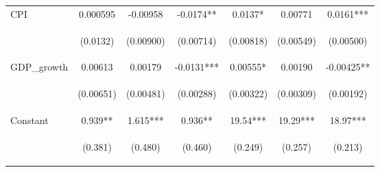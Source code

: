 \documentclass[]{article}
\begin{document}
\begin{center}
\begin{tabular}{lcccccc}
CPI & 0.000595 & -0.00958 & -0.0174** & 0.0137* & 0.00771 & 0.0161*** \\
\vspace{4pt} & \begin{footnotesize}(0.0132)\end{footnotesize} & \begin{footnotesize}(0.00900)\end{footnotesize} & \begin{footnotesize}(0.00714)\end{footnotesize} & \begin{footnotesize}(0.00818)\end{footnotesize} & \begin{footnotesize}(0.00549)\end{footnotesize} & \begin{footnotesize}(0.00500)\end{footnotesize} \\
GDP\_growth & 0.00613 & 0.00179 & -0.0131*** & 0.00555* & 0.00190 & -0.00425** \\
\vspace{4pt} & \begin{footnotesize}(0.00651)\end{footnotesize} & \begin{footnotesize}(0.00481)\end{footnotesize} & \begin{footnotesize}(0.00288)\end{footnotesize} & \begin{footnotesize}(0.00322)\end{footnotesize} & \begin{footnotesize}(0.00309)\end{footnotesize} & \begin{footnotesize}(0.00192)\end{footnotesize} \\
Constant & 0.939** & 1.615*** & 0.936** & 19.54*** & 19.29*** & 18.97*** \\
 & \begin{footnotesize}(0.381)\end{footnotesize} & \begin{footnotesize}(0.480)\end{footnotesize} & \begin{footnotesize}(0.460)\end{footnotesize} & \begin{footnotesize}(0.249)\end{footnotesize} & \begin{footnotesize}(0.257)\end{footnotesize} & \begin{footnotesize}(0.213)\end{footnotesize} \\

\end{tabular}
\end{center}
\end{document}
